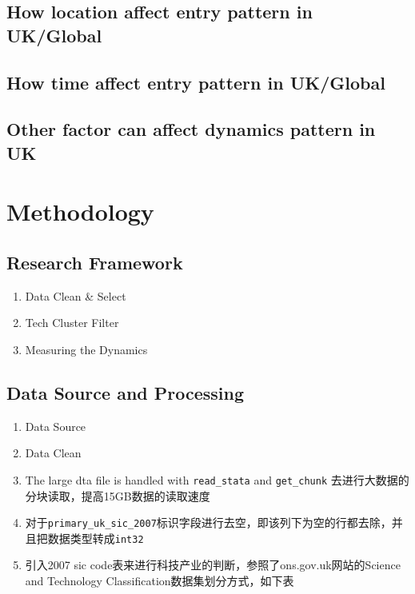 \documentclass[
  12pt,
  oneside]{book}
\providecommand{\tightlist}{%
  \setlength{\itemsep}{0pt}\setlength{\parskip}{0pt}}
\begin{document}
\hypertarget{how-location-affect-entry-pattern-in-ukglobal}{%
\section{How location affect entry pattern in UK/Global}\label{how-location-affect-entry-pattern-in-ukglobal}}

\hypertarget{how-time-affect-entry-pattern-in-ukglobal}{%
\section{How time affect entry pattern in UK/Global}\label{how-time-affect-entry-pattern-in-ukglobal}}

\hypertarget{other-factor-can-affect-dynamics-pattern-in-uk}{%
\section{Other factor can affect dynamics pattern in UK}\label{other-factor-can-affect-dynamics-pattern-in-uk}}

\hypertarget{methodology}{%
\chapter{Methodology}\label{methodology}}

\hypertarget{equations}{%
\section{Research Framework}\label{equations}}

\begin{enumerate}
\def\labelenumi{\arabic{enumi}.}
\tightlist
\item
  Data Clean \& Select
\item
  Tech Cluster Filter
\item
  Measuring the Dynamics
\end{enumerate}

\hypertarget{quotes}{%
\section{Data Source and Processing}\label{quotes}}

\begin{enumerate}
\def\labelenumi{\arabic{enumi}.}
\tightlist
\item
  Data Source
\item
  Data Clean
\item
  The large dta file is handled with \texttt{read\_stata} and \texttt{get\_chunk} 去进行大数据的分块读取，提高15GB数据的读取速度
\item
  对于\texttt{primary\_uk\_sic\_2007}标识字段进行去空，即该列下为空的行都去除，并且把数据类型转成\texttt{int32}
\item
  引入2007 sic code表来进行科技产业的判断，参照了ons.gov.uk网站的Science and Technology Classification数据集划分方式，如下表
\end{enumerate}
\end{document}
